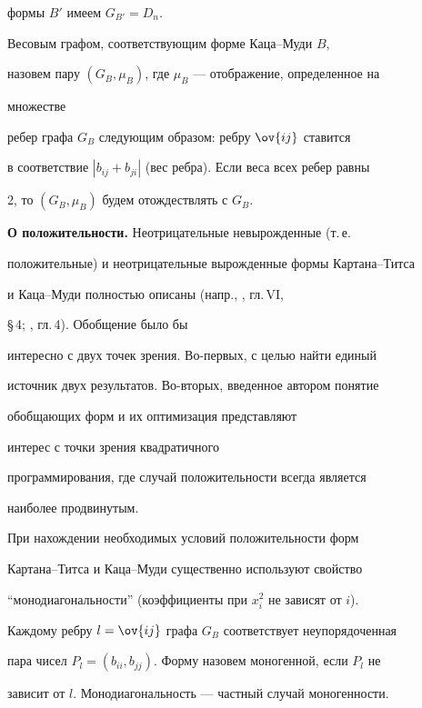 формы $B'$ имеем $G_{B'}=D_n$. 


\medskip 


 


Весовым графом, соответствующим форме Каца--Муди $B$, 


назовем пару $(G_B,\mu_B)$, где $\mu_B$ --- отображение, определенное на 


множестве 


ребер графа $G_B$ следующим образом: ребру $\ov{ij}$ ставится 


в соответствие $|b_{ij}+b_{ji}|$ (вес ребра). Если веса всех ребер равны 


2, то $(G_B,\mu_B)$ будем отождествлять с $G_B$. 


\medskip 


 


{\bf О положительности.} Неотрицательные невырожденные (т.\,е. 


положительные) и неотрицательные вырожденные формы Картана--Титса 


и Каца--Муди полностью описаны (напр., \cite{1}, гл.\,VI, 


\S\,4; \cite{2}, гл.\,4). Обобщение было бы 


интересно с двух точек зрения. Во-первых, с целью найти единый 


источник двух результатов. Во-вторых, введенное автором понятие 


обобщающих форм и их оптимизация представляют 


интерес \cite{3} с точки зрения квадратичного 


программирования, где случай положительности всегда является 


наиболее продвинутым. 


 


При нахождении необходимых условий положительности форм 


Картана--Титса и Каца--Муди существенно используют свойство 


``монодиагональности'' (коэффициенты при $x^2_i$ не зависят от $i$). 


Каждому ребру $l=\ov{ij}$ графа $G_B$ соответствует неупорядоченная 


пара чисел $P_l=(b_{ii},b_{jj})$. Форму назовем моногенной, если $P_l$ не 


зависит от $l$. Монодиагональность --- частный случай моногенности. 



